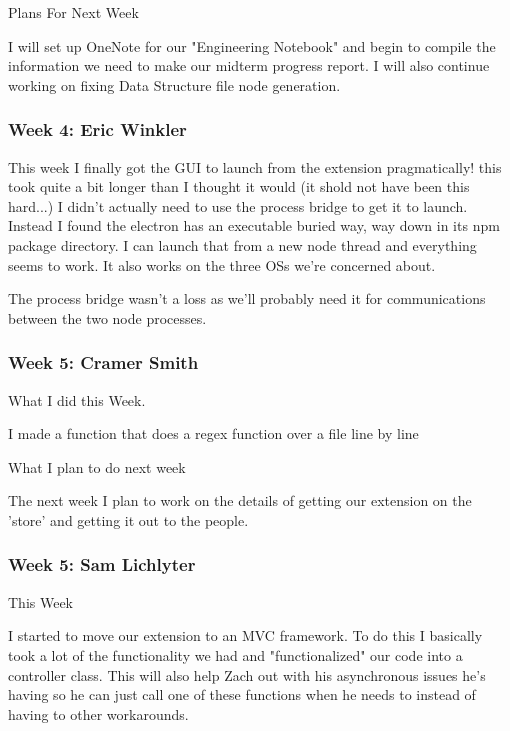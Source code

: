 Plans For Next Week

I will set up OneNote for our "Engineering Notebook" and begin to compile the information we need to make our midterm progress report. I will also continue working on fixing Data Structure file node generation. \\ 

 \subsubsection{Week 4: Eric Winkler}

This week I finally got the GUI to launch from the extension pragmatically! this took quite a bit longer than I thought it would (it shold not have been this hard...) I didn't actually need to use the process bridge to get it to launch. Instead I found the electron has an executable buried way, way down in its npm package directory. I can launch that from a new node thread and everything seems to work. It also works on the three OSs we're concerned about. 



The process bridge wasn't a loss as we'll probably need it for communications between the two node processes. \\ 

 \subsubsection{Week 5: Cramer Smith}

What I did this Week.



I made a function that does a regex function over a file line by line



What I plan to do next week



The next week I plan to work on the details of getting our extension on the 'store' and getting it out to the people.  \\ 

 \subsubsection{Week 5: Sam Lichlyter}

This Week

I started to move our extension to an MVC framework. To do this I basically took a lot of the functionality we had and "functionalized" our code into a controller class. This will also help Zach out with his asynchronous issues he's having so he can just call one of these functions when he needs to instead of having to other workarounds.



